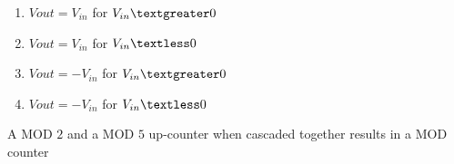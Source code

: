 \begin{enumerate}
    \item $V{out}=V_{in}$ for $V_{in}\textgreater 0$
    \item $V{out}=V_{in}$ for $V_{in}\textless 0$
    \item $V{out}=-V_{in}$ for $V_{in}\textgreater 0$
    \item $V{out}=-V_{in}$ for $V_{in}\textless 0$
\end{enumerate}
\item A MOD $2$ and a MOD $5$ up-counter when cascaded together results in a MOD counter \underline{\hspace{2cm}}

